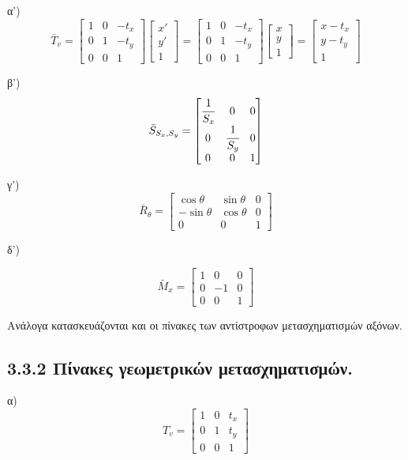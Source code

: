  α') 
\[
\bar{T}_v= \begin{bmatrix} 1 & 0 & -t_x \\ 0 & 1 & -t_y \\ 0 & 0 & 1 \end{bmatrix} \begin{bmatrix} x' \\ y' \\ 1 \end{bmatrix} = \begin{bmatrix} 1 & 0 & -t_x \\ 0 & 1 & -t_y \\ 0 & 0 & 1 \end{bmatrix} \begin{bmatrix} x \\ y \\ 1 \end{bmatrix} = \begin{bmatrix} x - t_x \\ y - t_y \\ 1 \end{bmatrix}
\]

 β') 
\[
\bar{S}_{S_x,S_y} = \begin{bmatrix} \cfrac{1}{S_x} & 0 & 0 \\ 0 & \cfrac{1}{S_y} & 0 \\ 0 & 0 & 1 \end{bmatrix}
\]

 γ')   
\[
\bar{R}_{\theta} = \begin{bmatrix} \cos\theta & \sin\theta & 0 \\ -\sin\theta & \cos\theta & 0 \\ 0 & 0 & 1 \end{bmatrix}
\]

 δ') 

\[
\bar{M}_x = \begin{bmatrix} 1 & 0 & 0 \\ 0 & -1 & 0 \\ 0 & 0 & 1 \end{bmatrix}
\]

 Ανάλογα κατασκευάζονται και οι πίνακες των αντίστροφων μετασχηματισμών αξόνων.

\subsection*{3.3.2 Πίνακες γεωμετρικών μετασχηματισμών.}

 α)
\[
T_v = \begin{bmatrix} 1 & 0 & t_x \\ 0 & 1 & t_y \\ 0 & 0 & 1 \end{bmatrix}
\]

